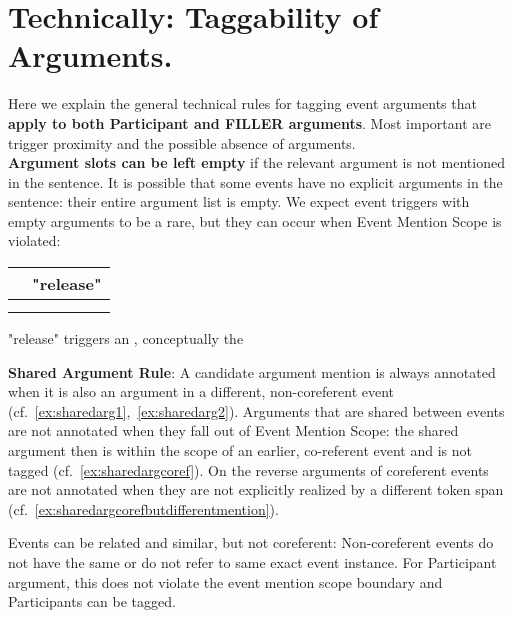 \section{Technically: Taggability of Arguments.}
Here we explain the general technical rules for tagging event arguments that \textbf{apply to both Participant and FILLER arguments}.
Most important are trigger proximity and the possible absence of arguments.\\

\noindent\textbf{Argument slots can be left empty} if the relevant argument is not mentioned in the sentence.
It is possible that some events have no explicit arguments in the sentence: their entire argument list is empty.
We expect event triggers with empty arguments to be a rare, but they can occur when Event Mention Scope is violated: 
\begin{exe}
\ex {}
    \expl \begin{tabular}{|L{6cm}|L{7cm}|} \hline
         & "release" \\\hline
         & \\
         & \\
        \hline \end{tabular}
    \expl "release" triggers an , conceptually the 
\end{exe}

\noindent\textbf{Shared Argument Rule}:
A candidate argument mention is always annotated when it is also an argument in a different, non-coreferent event (cf.~\ref{ex:sharedarg1},~\ref{ex:sharedarg2}).
Arguments that are shared between events are not annotated when they fall out of Event Mention Scope: the shared argument then is within the scope of an earlier, co-referent event and is not tagged (cf.~\ref{ex:sharedargcoref}).
On the reverse arguments of coreferent events are not annotated when they are not explicitly realized by a different token span (cf.~\ref{ex:sharedargcorefbutdifferentmention}).

Events can be related and similar, but not coreferent:
Non-coreferent events do not have the same  or do not refer to same exact event instance.
For Participant argument, this does not violate the event mention scope boundary and Participants can be tagged.

